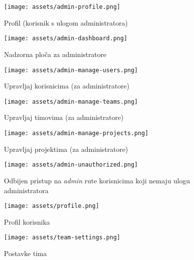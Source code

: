 \documentclass[12pt, a4paper]{article}
\begin{document}
\begin{appendices}
\appendix

\begin{figure}[H]
	\texttt{[image: assets/admin-profile.png]}
	\centering
	\caption{Profil (korisnik s ulogom administratora)}
	\label{fig:adminProfile}
\end{figure}

\begin{figure}[H]
	\texttt{[image: assets/admin-dashboard.png]}
	\centering
	\caption{Nadzorna ploča za administratore}	\label{fig:adminDashboard}
\end{figure}

\begin{figure}[H]
	\texttt{[image: assets/admin-manage-users.png]}
	\centering
	\caption{Upravljaj korisnicima (za administratore)}
	\label{fig:manageUsers}
\end{figure}

\begin{figure}[H]
	\texttt{[image: assets/admin-manage-teams.png]}
	\centering
	\caption{Upravljaj timovima (za administratore)}
	\label{fig:manageTeams}
\end{figure}

\begin{figure}[H]
	\texttt{[image: assets/admin-manage-projects.png]}
	\centering
	\caption{Upravljaj projektima (za administratore)}
	\label{fig:manageProjects}
\end{figure}

\begin{figure}[H]
	\texttt{[image: assets/admin-unauthorized.png]}
	\centering
	\caption{Odbijen pristup na \textit{admin} rute korisnicima koji nemaju ulogu administratora}
	\label{fig:adminUnauthorized}
\end{figure}

\begin{figure}[H]
	\texttt{[image: assets/profile.png]}
	\centering
	\caption{Profil korisnika}
	\label{fig:profile}
\end{figure}

\begin{figure}[H]
	\texttt{[image: assets/team-settings.png]}
	\centering
	\caption{Postavke tima}
	\label{fig:teamSettings}
\end{figure}


\end{appendices}
\end{document}
